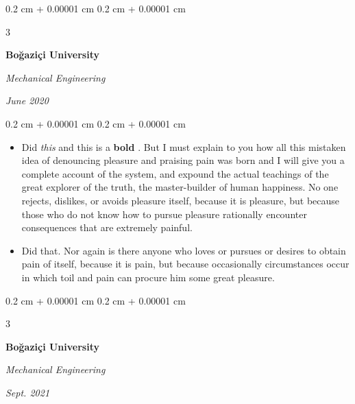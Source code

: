 \documentclass[10pt, letterpaper]{article}
\newenvironment{highlights}{
    \begin{itemize}[
        topsep=0.10 cm,
        parsep=0.10 cm,
        partopsep=0pt,
        itemsep=0pt,
        leftmargin=0.4 cm + 10pt + 0.6 cm
    ]
}{
    \end{itemize}
} %
\newenvironment{onecolentry}{
    \begin{adjustwidth}{
        0.2 cm + 0.00001 cm
    }{
        0.2 cm + 0.00001 cm
    }
}{
    \end{adjustwidth}
} %
\newenvironment{threecolentry}[3][]{
    \onecolentry
    \def\thirdColumn{#3}
    \setcolumnwidth{0.6 cm, \fill, 4.5 cm}
    \begin{paracol}{3}
    #2 \switchcolumn
}{
    \switchcolumn \raggedleft \thirdColumn
    \end{paracol}
    \endonecolentry
} %
\let\hrefWithoutArrow\href
\renewcommand{\href}[2]{\hrefWithoutArrow{#1}{\mbox{\ifthenelse{\equal{#2}{}}{ }{#2 }\raisebox{.15ex}{\footnotesize \faExternalLink*}}}}
\begin{document}
        \vspace{0.2 cm-3px}

        \begin{threecolentry}{
            \vspace*{\fill}
            \textbullet
            \vspace*{3px}
            \vspace*{\fill}
        }{
            
            
        \textit{June 2020}}
            \textbf{Boğaziçi University}

            \textit{Mechanical Engineering}
        \end{threecolentry}

        \vspace{0.10 cm-3px}
        \begin{onecolentry}
            \begin{highlights}
                \item Did \textit{this} and this is a \textbf{bold} \href{https://example.com}{link}. But I must explain to you how all this mistaken idea of denouncing pleasure and praising pain was born and I will give you a complete account of the system, and expound the actual teachings of the great explorer of the truth, the master-builder of human happiness. No one rejects, dislikes, or avoids pleasure itself, because it is pleasure, but because those who do not know how to pursue pleasure rationally encounter consequences that are extremely painful.
                \item Did that. Nor again is there anyone who loves or pursues or desires to obtain pain of itself, because it is pain, but because occasionally circumstances occur in which toil and pain can procure him some great pleasure.
            \end{highlights}
        \end{onecolentry}


        \vspace{0.2 cm-3px}

        \begin{threecolentry}{
            \vspace*{\fill}
            \textbullet
            \vspace*{3px}
            \vspace*{\fill}
        }{
            
            
        \textit{Sept. 2021}}
            \textbf{Boğaziçi University}

            \textit{Mechanical Engineering}
        \end{threecolentry}
\end{document}
